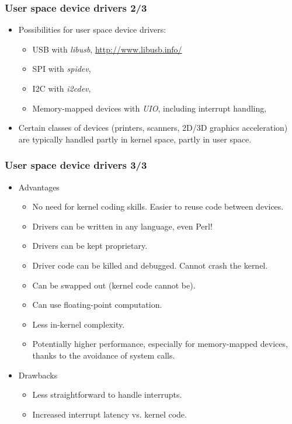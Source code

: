 \begin{frame}
  \frametitle{User space device drivers 2/3}
  \begin{itemize}
  \item Possibilities for user space device drivers:
    \begin{itemize}
    \item USB with {\em libusb}, \url{http://www.libusb.info/}
    \item SPI with {\em spidev}, 
    \item I2C with {\em i2cdev}, 
    \item Memory-mapped devices with {\em UIO}, including interrupt
      handling, 
    \end{itemize}
  \item Certain classes of devices (printers, scanners, 2D/3D graphics
    acceleration) are typically handled partly in kernel space, partly
    in user space.
  \end{itemize}
\end{frame}

\begin{frame}
  \frametitle{User space device drivers 3/3}
  \begin{itemize}
  \item Advantages
    \begin{itemize}
    \item No need for kernel coding skills. Easier to reuse code
      between devices.
    \item Drivers can be written in any language, even Perl!
    \item Drivers can be kept proprietary.
    \item Driver code can be killed and debugged. Cannot crash the
      kernel.
    \item Can be swapped out (kernel code cannot be).
    \item Can use floating-point computation.
    \item Less in-kernel complexity.
    \item Potentially higher performance, especially for
      memory-mapped devices, thanks to the avoidance of system calls.
    \end{itemize}
  \item Drawbacks
    \begin{itemize}
    \item Less straightforward to handle interrupts.
    \item Increased interrupt latency vs. kernel code.
    \end{itemize}
  \end{itemize}
\end{frame}
